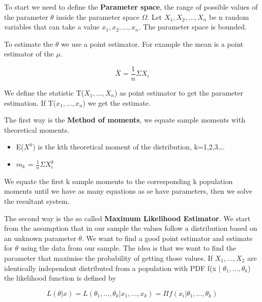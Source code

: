 \vspace{10pt}

To start we need to define the \textbf{Parameter space}, the range of possible values of the parameter $\theta$ inside the parameter space $\Omega$.
Let $X_1, X_2, ..., X_n$ be n random variables that can take a value $x_1, x_2, ..., x_n$.
The parameter space is bounded.

\vspace{10pt}

To estimate the $\theta$ we use a point estimator. For example the mean is a point estimator of the $\mu$.

\begin{equation}
    \bar{X} = \frac{1}{n} \Sigma X_i
\end{equation}

We define the statistic T($X_1, ..., X_n$) as point estimator to get the parameter estimation.
If T($x_1, ..., x_n$) we get the estimate.


\vspace{10pt}

The first way is the \textbf{Method of moments}, we equate sample moments with theoretical moments.

\begin{itemize}
    \item E($X^k$) is the kth theoretical moment of the distribution, k=1,2,3\dots.
    \item $m_k$ = $ \frac{1}{n} \Sigma X_i^k$
\end{itemize}

We equate the first k sample moments to the corresponding k population moments until we have as many equations as se have
parameters, then we solve the resultant system.

\vspace{10pt}

The second way is the so called \textbf{Maximum Likelihood Estimator}. We start from the
assumption that in our sample the values follow a distribution based on an unknown 
parameter $\theta$. We want to find a good point estimator and estimate for $\theta$ using
the data from our sample. The idea is that we want to find the parameter that maximise
the probability of getting those values. If $X_1, ..., X_2$ are identically independent 
distributed  from a population with PDF f(x | $\theta_1, ..., \theta_k$) the likelihood 
function is defined by

\begin{equation}
    L(\theta|x) = L(\theta_1, ..., \theta_k | x_1, ..., x_k) = \Pi f(x_i|\theta_1, ..., \theta_k)
\end{equation}

